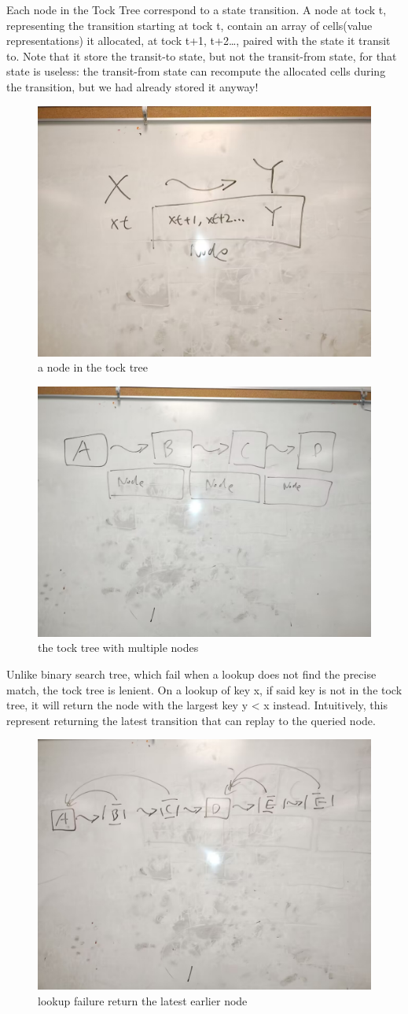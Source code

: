 Each node in the Tock Tree correspond to a state transition. A node at tock t, representing the transition starting at tock t, contain an array of cells(value representations) it allocated, at tock t+1, t+2\dots, paired with the state it transit to. Note that it store the transit-to state, but not the transit-from state, for that state is useless: the transit-from state can recompute the allocated cells during the transition, but we had already stored it anyway!
\begin{figure}
	\includegraphics[width=0.5\columnwidth]{2}
	\caption{a node in the tock tree}
\end{figure}
\begin{figure}
	\includegraphics[width=0.5\columnwidth]{3}
	\caption{the tock tree with multiple nodes}
\end{figure}

Unlike binary search tree, which fail when a lookup does not find the precise match, the tock tree is lenient. On a lookup of key x, if said key is not in the tock tree, it will return the node with the largest key y < x instead. Intuitively, this represent returning the latest transition that can replay to the queried node.
\begin{figure}
	\includegraphics[width=0.5\columnwidth]{4}
	\caption{lookup failure return the latest earlier node}
\end{figure}


